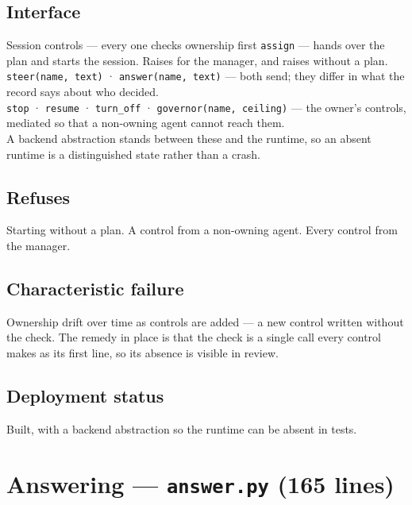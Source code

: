 \documentclass[11pt]{article}
\newcommand{\code}[1]{\texttt{\small #1}}
\begin{document}
\subsection{Interface}

\begin{specbox}{Session controls --- every one checks ownership first}
\code{assign} --- hands over the plan and starts the session. Raises for the manager, and raises without a plan.\\[3pt]
\code{steer(name, text)} · \code{answer(name, text)} --- both send; they differ in what the record says about who decided.\\[3pt]
\code{stop} · \code{resume} · \code{turn\_off} · \code{governor(name, ceiling)} --- the owner's controls, mediated so that a non-owning agent cannot reach them.\\[3pt]
A backend abstraction stands between these and the runtime, so an absent runtime is a distinguished state rather than a crash.
\end{specbox}

\subsection{Refuses}

Starting without a plan. A control from a non-owning agent. Every control from the manager.

\subsection{Characteristic failure}

Ownership drift over time as controls are added --- a new control written without the check. The remedy in place is that the check is a single call every control makes as its first line, so its absence is visible in review.

\subsection{Deployment status}

Built, with a backend abstraction so the runtime can be absent in tests.

\section{Answering --- \code{answer.py} (165 lines)}
\label{sec:answer}
\end{document}
